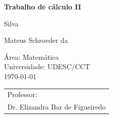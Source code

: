\documentclass[english,ngerman,parskip=half]{scrartcl}
\begin{document}

    \begin{titlepage}
        \vspace*{-3cm}

        \vspace*{5cm}
    \begin{center}
        \Huge\bfseries\sffamily Trabalho de cálculo II

        \vspace*{2cm}
        \large 
        Silva

        Mateus Schroeder da
    \end{center}

    \enlargethispage{3cm}
    \vfill
    \parbox[t]{0.45\textwidth}{%
                Área: Matemática \\
                    Universidade: UDESC/CCT \\
                    {\today}
                          }%
                          \hfill
                          \begin{tabular}[t]{l@{}}%
                              Professor:\\
                                Dr. Elizandra Bar de Figueiredo
                              \end{tabular}
                          \end{titlepage}
\end{document}
